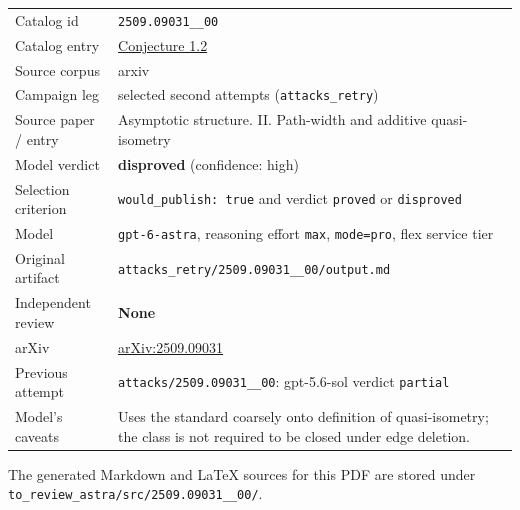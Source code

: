 \documentclass[
  11pt,
  a4paper,
]{article}
\newcounter{none} %
\begin{document}
{\def\LTcaptype{none} %
\begin{longtable}[]{@{}
  >{\raggedright\arraybackslash}p{}
  >{\raggedright\arraybackslash}p{}@{}}
\toprule\noalign{}
\endhead
\bottomrule\noalign{}
\endlastfoot
Catalog id & \texttt{2509.09031\_\_00} \\
Catalog entry &
\href{https://graph-theory-ai.github.io/graph-conjectures/arxiv/2509.09031__00/}{Conjecture
1.2} \\
Source corpus & arxiv \\
Campaign leg & selected second attempts (\texttt{attacks\_retry}) \\
Source paper / entry & Asymptotic structure. II. Path-width and additive
quasi-isometry \\
Model verdict & \textbf{disproved} (confidence: high) \\
Selection criterion & \texttt{would\_publish:\ true} and verdict
\texttt{proved} or \texttt{disproved} \\
Model & \texttt{gpt-6-astra}, reasoning effort \texttt{max},
\texttt{mode=pro}, flex service tier \\
Original artifact &
\texttt{attacks\_retry/2509.09031\_\_00/output.md} \\
Independent review & \textbf{None} \\
arXiv & \href{https://arxiv.org/abs/2509.09031}{arXiv:2509.09031} \\
Previous attempt & \texttt{attacks/2509.09031\_\_00}: gpt-5.6-sol
verdict \texttt{partial} \\
Model's caveats & Uses the standard coarsely onto definition of
quasi-isometry; the class is not required to be closed under edge
deletion. \\
\end{longtable}
}

The generated Markdown and LaTeX sources for this PDF are stored under
\texttt{to\_review\_astra/src/2509.09031\_\_00/}.
\end{document}
